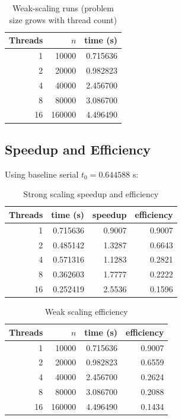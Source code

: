 \documentclass[11pt]{article}
\begin{document}
\begin{table}[h]
\centering
\caption{Weak-scaling runs (problem size grows with thread count)}
\begin{tabular}{rrr}
\toprule
Threads & \(n\) & time (s) \\
\midrule
1 & 10000 & 0.715636 \\
2 & 20000 & 0.982823 \\
4 & 40000 & 2.456700 \\
8 & 80000 & 3.086700 \\
16 & 160000 & 4.496490 \\
\bottomrule
\end{tabular}
\end{table}

\subsection{Speedup and Efficiency}
Using baseline serial \(t_0 = 0.644588\) s:
\begin{table}[h]
\centering
\caption{Strong scaling speedup and efficiency}
\begin{tabular}{rrrr}
\toprule
Threads & time (s) & speedup & efficiency \\
\midrule
1 & 0.715636 & 0.9007 & 0.9007 \\
2 & 0.485142 & 1.3287 & 0.6643 \\
4 & 0.571316 & 1.1283 & 0.2821 \\
8 & 0.362603 & 1.7777 & 0.2222 \\
16 & 0.252419 & 2.5536 & 0.1596 \\
\bottomrule
\end{tabular}
\end{table}

\begin{table}[h]
\centering
\caption{Weak scaling efficiency}
\begin{tabular}{rrrr}
\toprule
Threads & \(n\) & time (s) & efficiency \\
\midrule
1 & 10000 & 0.715636 & 0.9007 \\
2 & 20000 & 0.982823 & 0.6559 \\
4 & 40000 & 2.456700 & 0.2624 \\
8 & 80000 & 3.086700 & 0.2088 \\
16 & 160000 & 4.496490 & 0.1434 \\
\bottomrule
\end{tabular}
\end{table}
\end{document}
